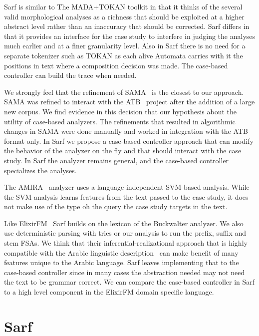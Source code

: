 \documentclass[11pt,letterpaper]{article}
\begin{document}
Sarf is similar to The MADA+TOKAN toolkit in that it thinks of
the several valid morphological analyses as a richness that 
should be exploited at a higher abstract level rather than
an inaccuracy that should be corrected. 
Sarf differs in that it provides an interface for the 
case study to interfere in judging the analyses much earlier and
at a finer granularity level. 
Also in Sarf there is no need for a separate tokenizer such as
TOKAN as each alive Automata carries with it the positions in 
text where a composition decision was made. 
The case-based controller can build the trace when needed. 


We strongly feel that the refinement of SAMA~\cite{Maamouri:10} 
is the closest to our approach. SAMA was refined to interact with
the ATB~\cite{Maamouri:04} project after the addition of a large 
new corpus. We find evidence in this decision that our hypothesis
about the utility of case-based analyzers. The refinements
that resulted in algorithmic changes in SAMA were done manually
and worked in integration with the ATB format only. 
In Sarf we propose a case-based controller approach that can modify 
the behavior of the analyzer on the fly and that should interact
with the case study. In Sarf the analyzer remains general, and the 
case-based controller specializes the analyses.

The AMIRA~\cite{Diab:07} analyzer uses 
a language independent SVM based analysis. 
While the SVM analysis learns features from the text passed to the case
study, it does not make use of the type oh the query the 
case study targets in the text. 

Like ElixirFM~\cite{Otakar:07} Sarf builds on the lexicon
of the Buckwalter analyzer. 
We also use deterministic parsing with tries or our analysis 
to run the prefix, suffix and stem FSAs. 
We think that their inferential-realizational approach 
that is highly compatible with the Arabic linguistic 
description~\cite{Badawi:04}
can make benefit of many features unique to the Arabic language.
Sarf leaves implementing that to the case-based controller
since in many cases the abstraction needed may not need the 
text to be grammar correct.
We can compare the case-based controller in Sarf to a high level
component in the ElixirFM domain specific language. 

\section{Sarf}
\label{sec:sarf}
\end{document}
